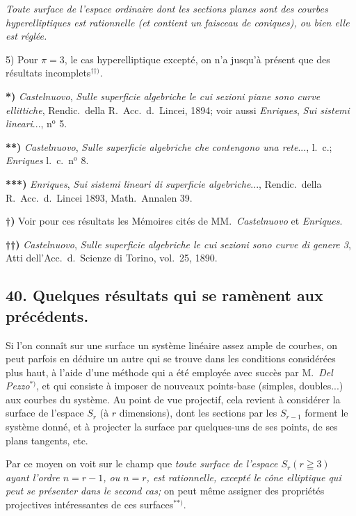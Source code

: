 \documentclass{article}
\begin{document}
\emph{Toute surface de l'espace ordinaire dont les sections planes sont des courbes hyperelliptiques est rationnelle (et contient un faisceau de coniques), ou bien elle est réglée.}

5) Pour $\pi = 3$, le cas hyperelliptique excepté, on n'a jusqu'à présent que des résultats incomplets${}^{\dagger\dagger)}$.

\textbf{*)} \emph{Castelnuovo}, \emph{Sulle superficie algebriche le cui sezioni piane sono curve ellittiche}, Rendic.\ della R.\ Acc.\ d.\ Lincei, 1894; voir aussi \emph{Enriques}, \emph{Sui sistemi lineari}..., n${}^{\text{o}}$ 5.

\textbf{**)} \emph{Castelnuovo}, \emph{Sulle superficie algebriche che contengono una rete}..., l.\ c.; \emph{Enriques} l.\ c.\ n${}^{\text{o}}$ 8.

\textbf{***)} \emph{Enriques}, \emph{Sui sistemi lineari di superficie algebriche}..., Rendic.\ della R.\ Acc.\ d.\ Lincei 1893, Math.\ Annalen 39.

\textbf{†)} Voir pour ces résultats les Mémoires cités de MM.\ \emph{Castelnuovo} et \emph{Enriques}.

\textbf{††)} \emph{Castelnuovo}, \emph{Sulle superficie algebriche le cui sezioni sono curve di genere 3}, Atti dell'Acc.\ d.\ Scienze di Torino, vol.\ 25, 1890.


\subsection*{40. Quelques résultats qui se ramènent aux précédents.}

Si l'on connaît sur une surface un système linéaire assez ample de courbes, on peut parfois en déduire un autre qui se trouve dans les conditions considérées plus haut, à l'aide d'une méthode qui a été employée avec succès par M.\ \emph{Del Pezzo}${}^{*)}$, et qui consiste à imposer de nouveaux points-base (simples, doubles...) aux courbes du système. Au point de vue projectif, cela revient à considérer la surface de l'espace $S_{r}$ (à $r$ dimensions), dont les sections par les $S_{r-1}$ forment le système donné, et à projecter la surface par quelques-uns de ses points, de ses plans tangents, etc.

Par ce moyen on voit sur le champ que \emph{toute surface de l'espace $S_{r}(r \geqq 3)$ ayant l'ordre $n = r - 1$, ou $n = r$, est rationnelle, excepté le cône elliptique qui peut se présenter dans le second cas;} on peut même assigner des propriétés projectives intéressantes de ces surfaces${}^{**)}$.
\end{document}
